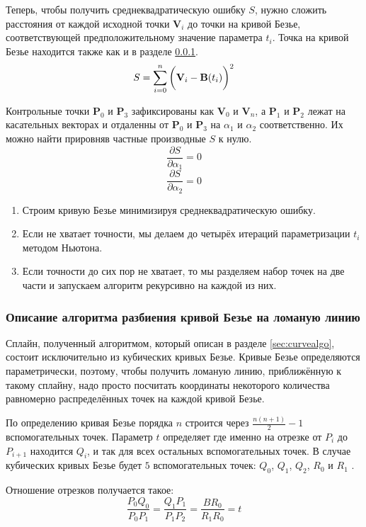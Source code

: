 \documentclass[a4paper,12pt]{article}
\begin{document}
  Теперь, чтобы получить среднеквадратическую ошибку $S$, нужно сложить расстояния от каждой исходной точки $\mathbf{V}_i$ до точки на кривой Безье, соответствующей предположительному значение параметра $t_i$.
  Точка на кривой Безье находится также как и в разделе \ref{sec:wikialgo}.
  $$ S = \sum_{i=0}^n \left(\vphantom{\frac{1}{2}}\mathbf{V}_i-\mathbf{B}(t_i)\right)^2 $$

  Контрольные точки $\mathbf{P}_0$ и $\mathbf{P}_3$ зафиксированы как $\mathbf{V}_0$ и $\mathbf{V}_n$,
  а $\mathbf{P}_1$ и $\mathbf{P}_2$ лежат на касательных векторах и отдаленны от $\mathbf{P}_0$ и $\mathbf{P}_3$ на $\alpha_1$ и $\alpha_2$ соответственно.
  Их можно найти прировняв частные производные $S$ к нулю.
  $$\frac{\partial S}{\partial \alpha_1} = 0$$
  $$\frac{\partial S}{\partial \alpha_2} = 0$$

  \begin{enumerate}
    \item Строим кривую Безье минимизируя среднеквадратическую ошибку.
    \item Если не хватает точности, мы делаем до четырёх итераций параметризации $t_i$ методом Ньютона\cite{NewtonRaphson}.
    \item Если точности до сих пор не хватает, то мы разделяем набор точек на две части и запускаем алгоритм рекурсивно на каждой из них.
  \end{enumerate}

  \subsubsection{Описание алгоритма разбиения кривой Безье на ломаную линию}
  \label{sec:wikialgo}
  Сплайн, полученный алгоритмом, который описан в разделе \ref{sec:curvealgo}, состоит исключительно из кубических кривых Безье.
  Кривые Безье определяются параметрически, поэтому, чтобы получить ломаную линию, приближённую к такому сплайну,
  надо просто посчитать координаты некоторого количества равномерно распределённых точек на каждой кривой Безье.

  По определению кривая Безье порядка $n$ строится через $\frac{n(n+1)}{2}-1$ вспомогательных точек.
  Параметр $t$ определяет где именно на отрезке от $P_i$ до $P_{i+1}$ находится $Q_i$, и так для всех остальных вспомогательных точек.
  В случае кубических кривых Безье будет $5$ вспомогательных точек:
  $Q_0$, $Q_1$, $Q_2$, $R_0 $ и $R_1$ .

  Отношение отрезков получается такое:
  $$ \frac{P_{0}Q_{0}}{P_{0}P_{1}}=\frac{Q_{1}P_{1}}{P_{1}P_{2}}=\frac{BR_{0}}{R_{1}R_{0}} = t $$
\end{document}
